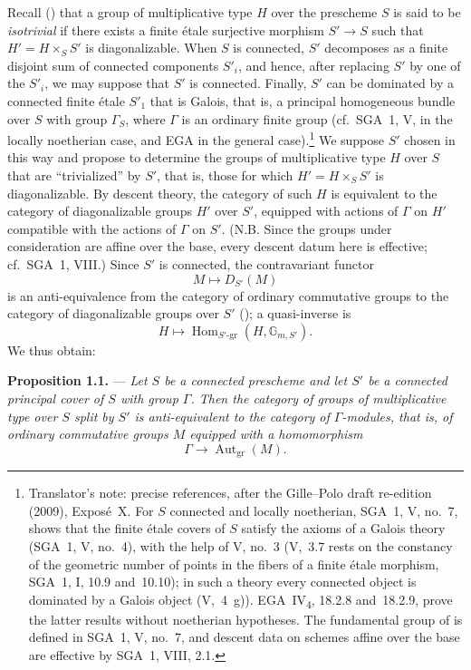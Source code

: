 Recall () that a group of multiplicative type \(H\) over the
prescheme \(S\) is said to be \emph{isotrivial} if there exists a finite
étale surjective morphism \(S'\to S\) such that
\(H'=H\times_S S'\) is diagonalizable. When \(S\) is connected,
\(S'\) decomposes as a finite disjoint sum of connected components
\(S'_i\), and hence, after replacing \(S'\) by one of the \(S'_i\), we
may suppose that \(S'\) is connected. Finally, \(S'\) can be dominated
by a connected finite étale \(S'_1\) that is Galois, that is, a
principal homogeneous bundle over \(S\) with group \(\Gamma_S\), where
\(\Gamma\) is an ordinary finite group (cf.\ SGA~1, V, in the locally
noetherian case, and EGA in the general case).\footnote{Translator's
note: precise references, after the Gille--Polo draft re-edition (2009),
Expos\'e~X. For \(S\) connected and locally noetherian, SGA~1, V, no.~7,
shows that the finite \'etale covers of \(S\) satisfy the axioms of a
Galois theory (SGA~1, V, no.~4), with the help of V, no.~3 (V,~3.7 rests
on the constancy of the geometric number of points in the fibers of a
finite \'etale morphism, SGA~1, I, 10.9 and~10.10); in such a theory every
connected object is dominated by a Galois object (V,~4~g)).
EGA~IV\textsubscript{4}, 18.2.8 and~18.2.9, prove the latter results
without noetherian hypotheses. The fundamental group of
 is defined in SGA~1, V, no.~7, and
descent data on schemes affine over the base are effective by SGA~1,
VIII, 2.1.}
We suppose \(S'\) chosen in this way and propose to determine the
groups of multiplicative type \(H\) over \(S\) that are
``trivialized'' by \(S'\), that is, those for which
\(H'=H\times_S S'\) is diagonalizable.
By descent theory, the category of such \(H\)
is equivalent to the category of diagonalizable groups \(H'\) over
\(S'\), equipped with actions of \(\Gamma\) on \(H'\) compatible with
the actions of \(\Gamma\) on \(S'\). (N.B. Since the groups under
consideration are affine over the base, every descent datum here is
effective; cf.\ SGA~1, VIII.) Since \(S'\) is connected, the
contravariant functor
\[
  M\longmapsto D_{S'}(M)
\]
is an anti-equivalence from the category of ordinary commutative
groups to the category of diagonalizable groups over \(S'\)
(); a quasi-inverse is
\[
  H\longmapsto
  \operatorname{Hom}_{S'\text{-}\mathrm{gr}}(H,\mathbb G_{m,S'}).
\]
We thus obtain:

\medskip
\noindent{}%
\textbf{Proposition 1.1.} ---
\textit{Let \(S\) be a connected prescheme and let \(S'\) be a
connected principal cover of \(S\) with group \(\Gamma\). Then
the category of groups of multiplicative type over \(S\) split by
\(S'\) is
anti-equivalent to the category of \(\Gamma\)-modules, that is, of
ordinary commutative groups \(M\) equipped with a homomorphism
\[
  \Gamma\longrightarrow\operatorname{Aut}_{\mathrm{gr}}(M).
\]}

